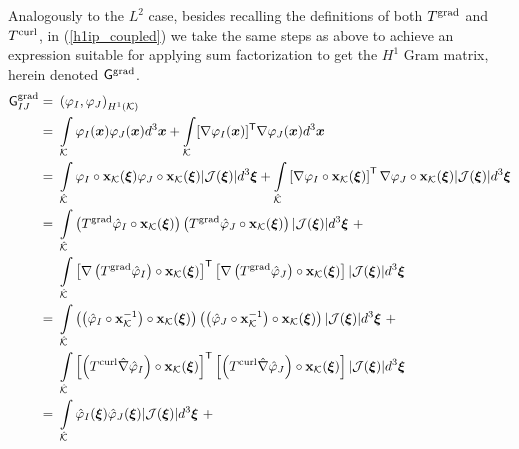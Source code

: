 Analogously to the $L^2$ case, besides recalling the definitions of both $T^{\operatorname{grad}}$ and $T^{\operatorname{curl}}$, in (\ref{h1ip_coupled}) we take the same steps as above to achieve an expression suitable for applying sum factorization to get the $H^1$ Gram matrix, herein denoted $\mathsf{G}^{\operatorname{grad}}$.
% 
\begin{align}
                          \sfG^{\grad}_{IJ}  =\ &\left(\varphi_I,\varphi_J\right)_{\HSo^1(\mcK)} \nonumber\\
                                        \ =\ & \int\limits_{\mcK}\varphi_I(\bsx)\varphi_J(\bsx)d^3\bsx + \int\limits_{\mcK}[\nabla\varphi_I(\bsx)]^\T\nabla\varphi_J(\bsx)d^3\bsx \nonumber\\
                                        \ =\ & \int\limits_{\hatK}\varphi_I\circ\bfx_\mcK(\bsxi)\varphi_J\circ\bfx_\mcK(\bsxi)|\mcJ(\bsxi)|d^3\bsxi +
                                        \int\limits_{\hatK}\left[\nabla\varphi_I\circ\bfx_\mcK(\bsxi)\right]^\T\nabla\varphi_J\circ\bfx_\mcK(\bsxi)|\mcJ(\bsxi)|d^3\bsxi \nonumber\\
                                        \ =\ & \int\limits_{\hatK}
                                        \left(T^{\grad}\hat{\varphi}_I\circ\bfx_\mcK(\bsxi)\right)\left(T^{\grad}\hat{\varphi}_J\circ\bfx_\mcK(\bsxi)\right)|\mcJ(\bsxi)|d^3\bsxi \ +\nonumber\\*
                                        \ & \int\limits_{\hatK}
                                        \left[\nabla\left(T^{\grad}\hat{\varphi}_I\right)\circ\bfx_\mcK(\bsxi)\right]^\T\left[\nabla \left(T^{\grad}\hat{\varphi}_J\right)\circ\bfx_\mcK(\bsxi)\right]|\mcJ(\bsxi)|d^3\bsxi \nonumber\\
                                        =\ & \int\limits_{\hatK}
                                        \left(\left(\hat{\varphi}_I\circ\bfx_\mcK^{-1}\right)\circ\bfx_\mcK(\bsxi)\right)\left(\left(\hat{\varphi}_J\circ\bfx_\mcK^{-1}\right)\circ\bfx_\mcK(\bsxi)\right)|\mcJ(\bsxi)|d^3\bsxi \ +\nonumber\\*
                                        \ & \int\limits_{\hatK}
                                        \left[\left(T^{\curl}\hat{\nabla}\hat{\varphi}_I\right)\circ\bfx_\mcK(\bsxi)\right]^\T \left[\left(T^{\curl}\hat{\nabla}\hat{\varphi}_J\right)\circ\bfx_\mcK(\bsxi)\right]|\mcJ(\bsxi)|d^3\bsxi \nonumber\\
                                        =\ & \int\limits_{\hatK}
                                        \hat{\varphi}_I(\bsxi)\hat{\varphi}_J(\bsxi)|\mcJ(\bsxi)|d^3\bsxi \ +\nonumber\\*

\end{align}
